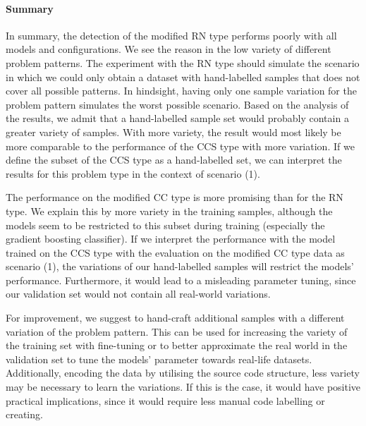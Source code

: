 \paragraph{Summary}
In summary, the detection of the modified RN type performs poorly with all models and configurations. We see the reason in the low variety of different problem patterns. The experiment with the RN type should simulate the scenario in which we could only obtain a dataset with hand-labelled samples that does not cover all possible patterns. In hindsight, having only one sample variation for the problem pattern simulates the worst possible scenario. Based on the analysis of the results, we admit that a hand-labelled sample set would probably contain a greater variety of samples. With more variety, the result would most likely be more comparable to the performance of the CCS type with more variation. If we define the subset of the CCS type as a hand-labelled set, we can interpret the results for this problem type in the context of scenario (1). 

The performance on the modified CC type is more promising than for the RN type. We explain this by more variety in the training samples, although the models seem to be restricted to this subset during training (especially the gradient boosting classifier). If we interpret the performance with the model trained on the CCS type with the evaluation on the modified CC type data as scenario (1), the variations of our hand-labelled samples will restrict the models' performance. Furthermore, it would lead to a misleading parameter tuning, since our validation set would not contain all real-world variations.

For improvement, we suggest to hand-craft additional samples with a different variation of the problem pattern. This can be used for increasing the variety of the training set with fine-tuning or to better approximate the real world in the validation set to tune the models' parameter towards real-life datasets. Additionally, encoding the data by utilising the source code structure, less variety may be necessary to learn the variations. If this is the case, it would have positive practical implications, since it would require less manual code labelling or creating.



